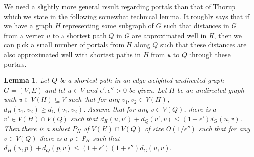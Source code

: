 \documentclass[11pt]{article}
\newtheorem{lemma}{Lemma}
\begin{document}
We need a slightly more general result regarding portals than that of Thorup which we state in the following somewhat technical lemma. It roughly says that if we have a graph $H$ representing some subgraph of $G$ such that distances in $G$ from a vertex $u$ to a shortest path $Q$ in $G$ are approximated well in $H$, then we can pick a small number of portals from $H$ along $Q$ such that these distances are also approximated well with shortest paths in $H$ from $u$ to $Q$ through these portals.
\begin{lemma}\label{Lem:Portal}
Let $Q$ be a shortest path in an edge-weighted undirected graph $G = (V,E)$ and let $u\in V$ and $\epsilon',\epsilon'' > 0$ be given. Let $H$ be an undirected graph with $u\in V(H)\subseteq V$ such that for any $v_1,v_2\in V(H)$, $d_H(v_1,v_2)\geq d_G(v_1,v_2)$. Assume that for any $v\in V(Q)$, there is a $v'\in V(H)\cap V(Q)$ such that $d_H(u,v') + d_Q(v',v)\leq (1+\epsilon')d_G(u,v)$. Then there is a subset $P_H$ of $V(H)\cap V(Q)$ of size $O(1/\epsilon'')$ such that for any $v\in V(Q)$ there is a $p\in P_H$ such that $d_H(u,p) + d_Q(p,v)\leq (1+\epsilon')(1+\epsilon'')d_G(u,v)$.
\end{lemma}
\end{document}
